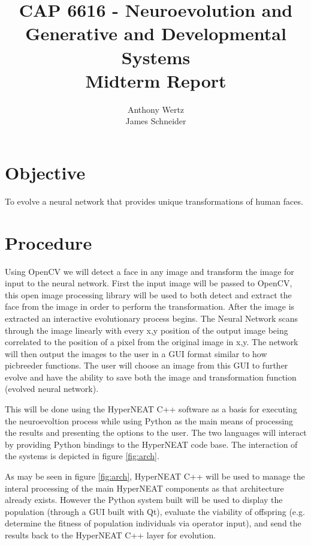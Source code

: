 \documentclass[a4paper,10pt]{article}
\title{CAP 6616 - Neuroevolution and Generative and Developmental Systems\\Midterm Report}
\author{Anthony Wertz \\ James Schneider}
\begin{document}
\maketitle

\section{Objective}

To evolve a neural network that provides unique transformations of human faces.

\section{Procedure}
\label{sec:procedure}

Using OpenCV we will detect a face in any image and transform the image for input to the neural network. First the input image will be passed to OpenCV, this open image processing library will be used to both detect and extract the face from the image in order to perform the transformation. After the image is extracted an interactive evolutionary process begins. The Neural Network scans through the image linearly with every x,y position of the output image being correlated to the position of a pixel from the original image in x,y. The network will then output the images to the user in a GUI format similar to how picbreeder functions. The user will choose an image from this GUI to further evolve and have the ability to save both the image and transformation function (evolved neural network).

This will be done using the HyperNEAT C++ software as a basis for executing the neuroevoltion process while using Python as the main means of processing the results and presenting the options to the user. The two languages will interact by providing Python bindings to the HyperNEAT code base. The interaction of the systems is depicted in figure \ref{fig:arch}.


As may be seen in figure \ref{fig:arch}, HyperNEAT C++ will be used to manage the interal processing of the main HyperNEAT components as that architecture already exists. However the Python system built will be used to display the population (through a GUI built with Qt), evaluate the viability of offspring (e.g. determine the fitness of population individuals via operator input), and send the results back to the HyperNEAT C++ layer for evolution.
\end{document}
